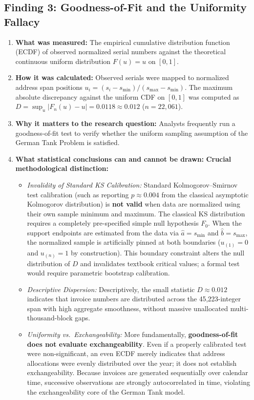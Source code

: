 \documentclass[10pt,a4paper]{article}
\begin{document}
\subsection{Finding 3: Goodness-of-Fit and the Uniformity Fallacy}
\begin{enumerate}
    \item \textbf{What was measured:} The empirical cumulative distribution function (ECDF) of observed normalized serial numbers against the theoretical continuous uniform distribution $F(u) = u$ on $[0, 1]$.
    \item \textbf{How it was calculated:} Observed serials were mapped to normalized address span positions $u_i = (s_i - s_{\min}) / (s_{\max} - s_{\min})$. The maximum absolute discrepancy against the uniform CDF on $[0, 1]$ was computed as $D = \sup_u |F_n(u) - u| = 0.0118 \approx 0.012$ ($n = 22,061$).
    \item \textbf{Why it matters to the research question:} Analysts frequently run a goodness-of-fit test to verify whether the uniform sampling assumption of the German Tank Problem is satisfied.
    \item \textbf{What statistical conclusions can and cannot be drawn:} \textbf{Crucial methodological distinction:}
    \begin{itemize}
        \item \textit{Invalidity of Standard KS Calibration:} Standard Kolmogorov--Smirnov test calibration (such as reporting $p \approx 0.004$ from the classical asymptotic Kolmogorov distribution) is \textbf{not valid} when data are normalized using their own sample minimum and maximum. The classical KS distribution requires a completely pre-specified simple null hypothesis $F_0$. When the support endpoints are estimated from the data via $\hat{a} = s_{\min}$ and $\hat{b} = s_{\max}$, the normalized sample is artificially pinned at both boundaries ($u_{(1)} = 0$ and $u_{(n)} = 1$ by construction). This boundary constraint alters the null distribution of $D$ and invalidates textbook critical values; a formal test would require parametric bootstrap calibration.
        \item \textit{Descriptive Dispersion:} Descriptively, the small statistic $D \approx 0.012$ indicates that invoice numbers are distributed across the 45,223-integer span with high aggregate smoothness, without massive unallocated multi-thousand-block gaps.
        \item \textit{Uniformity vs.\ Exchangeability:} More fundamentally, \textbf{goodness-of-fit does not evaluate exchangeability}. Even if a properly calibrated test were non-significant, an even ECDF merely indicates that address allocations were evenly distributed over the year; it does not establish exchangeability. Because invoices are generated sequentially over calendar time, successive observations are strongly autocorrelated in time, violating the exchangeability core of the German Tank model.
    \end{itemize}
\end{enumerate}
\end{document}
